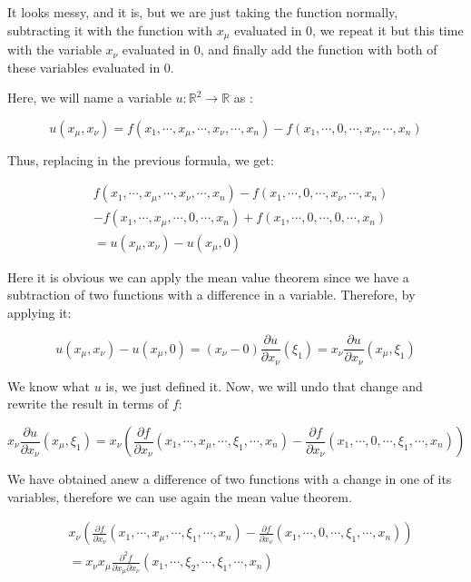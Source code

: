 \documentclass[12pt]{article}
\begin{document}
	It looks messy, and it is, but we are just taking the function normally, subtracting it with the function with $x_\mu$ evaluated in 0, we repeat it but this time with the variable $x_\nu$ evaluated in 0, and finally add the function with both of these variables evaluated in 0.
	
	Here, we will name a variable $u : \mathbb{R}^2 \to \mathbb{R}$ as :
	
	\[
		u(x_\mu, x_\nu) = f(x_1, \cdots, x_\mu, \cdots, x_\nu, \cdots, x_n) - f(x_1, \cdots, 0, \cdots, x_\nu, \cdots, x_n)
	\]
	
	Thus, replacing in the previous formula, we get:
	
	\[
		\begin{aligned}
			& f(x_1, \cdots, x_\mu, \cdots, x_\nu, \cdots, x_n) - f(x_1, \cdots, 0, \cdots, x_\nu, \cdots, x_n)
			\\
			& - f(x_1, \cdots, x_\mu, \cdots, 0, \cdots, x_n) + f(x_1, \cdots, 0, \cdots, 0, \cdots, x_n)
			\\
			& = u(x_\mu, x_\nu) - u(x_\mu, 0)
		\end{aligned}
	\]
	
	Here it is obvious we can apply the mean value theorem since we have a subtraction of two functions with a difference in a variable. Therefore, by applying it:
	
	\[
		u(x_\mu, x_\nu) - u(x_\mu, 0)
		= (x_\nu - 0) \frac{\partial u}{\partial x_\nu}(\xi_1)
		= x_\nu \frac{\partial u}{\partial x_\nu}(x_\mu, \xi_1)
	\]
	
	We know what $u$ is, we just defined it. Now, we will undo that change and rewrite the result in terms of $f$:
	
	\[
		x_\nu \frac{\partial u}{\partial x_\nu}(x_\mu, \xi_1)
		= x_\nu \left( \frac{\partial f}{\partial x_\nu}(x_1, \cdots, x_\mu, \cdots, \xi_1, \cdots, x_n) - \frac{\partial f}{\partial x_\nu}(x_1, \cdots, 0, \cdots, \xi_1, \cdots, x_n) \right)
	\]
	
	We have obtained anew a difference of two functions with a change in one of its variables, therefore we can use again the mean value theorem.
	
	\[
		\begin{aligned}
			& x_\nu \left( \frac{\partial f}{\partial x_\nu}(x_1, \cdots, x_\mu, \cdots, \xi_1, \cdots, x_n) - \frac{\partial f}{\partial x_\nu}(x_1, \cdots, 0, \cdots, \xi_1, \cdots, x_n) \right)
			\\
			& = x_\nu x_\mu \frac{\partial^2 f}{\partial x_\mu \partial x_\nu}(x_1, \cdots, \xi_2, \cdots, \xi_1, \cdots, x_n)
		\end{aligned}
	\]
	
\end{document}
